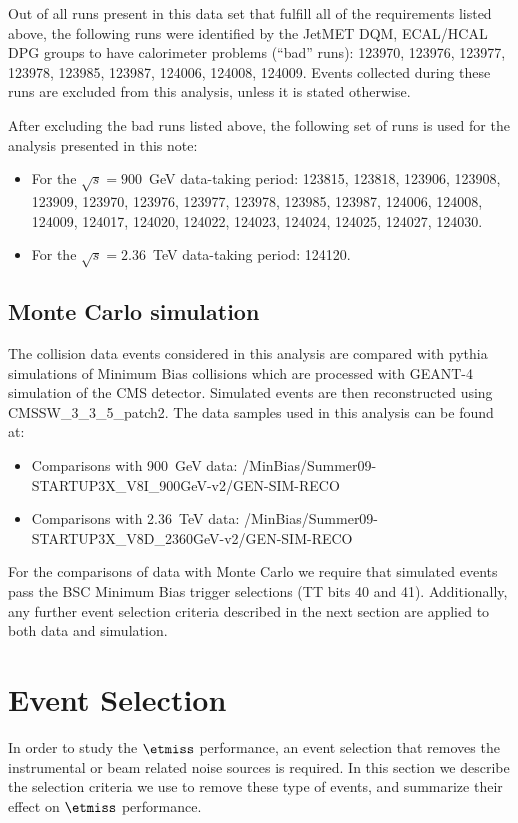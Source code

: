 Out of all runs present in this data set that fulfill all
of the requirements listed above, the following runs were identified by the
JetMET DQM, ECAL/HCAL DPG groups to have
calorimeter problems (``bad'' runs): 123970, 123976, 123977, 123978, 123985, 123987,
124006, 124008, 124009. Events collected during these runs are excluded
from this analysis, unless it is stated otherwise.

After excluding the bad runs listed above, the following set of runs is
used for the analysis presented in this note:
\begin{itemize}
\item For the $\sqrt{s}=900$~GeV data-taking period:
123815, 123818, 123906, 123908, 123909, 123970, 123976, 123977, 123978,
123985, 123987, 124006, 124008, 124009, 124017, 124020, 124022, 124023,
124024, 124025, 124027, 124030. 

\item For the $\sqrt{s}=2.36$~TeV data-taking period: 124120.

\end{itemize}

\subsection{Monte Carlo simulation}

The collision data events considered in this analysis are compared with
{\sc pythia} simulations of Minimum Bias collisions which are processed
with {\sc GEANT-4} simulation of the CMS detector. Simulated events are
then reconstructed using CMSSW\_3\_3\_5\_patch2. The data samples used in
this analysis can be found at:
\begin{itemize}
\item Comparisons with 900~GeV data: /MinBias/Summer09-STARTUP3X\_V8I\_900GeV-v2/GEN-SIM-RECO
\item Comparisons with 2.36~TeV data: /MinBias/Summer09-STARTUP3X\_V8D\_2360GeV-v2/GEN-SIM-RECO
\end{itemize}

For the comparisons of data with Monte Carlo we require that simulated
events pass the BSC Minimum Bias trigger selections (TT bits 40 and
41). Additionally, any further event selection criteria described in the next section
are applied to both data and simulation.

\section{Event Selection}
In order to study the $\etmiss$ performance, an
event selection that removes the instrumental or beam related noise
sources is required. In this section we describe the selection criteria
we use to remove these type of events, and summarize their effect on
$\etmiss$ performance.


